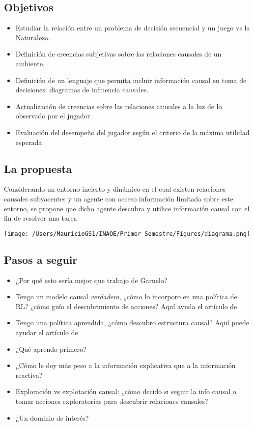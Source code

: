 \documentclass[11pt]{article}
\theoremstyle{plain}
\begin{document}
\subsection{Objetivos}
\begin{itemize}
\item Estudiar la relación entre un problema de decisión secuencial y un juego vs la Naturaleza.
\item Definición de creencias subjetivas sobre las relaciones causales de un ambiente.
\item Definición de un lenguaje que permita incluir información causal en toma de decisiones: diagramas de influencia causales.
\item Actualización de creencias sobre las relaciones causales a la luz de lo observado por el jugador.
\item Evaluación del desempeño del jugador según el criterio de la máxima utilidad esperada
\end{itemize}
\subsection{La propuesta}
Considerando un entorno incierto y dinámico en el cual existen relaciones causales subyacentes y un agente con acceso información limitada sobre este entorno, se propone que dicho agente descubra y utilice información causal con el fin de resolver una tarea
\begin{center}
\texttt{[image: /Users/MauricioGS1/INAOE/Primer\_Semestre/Figures/diagrama.png]}
\end{center}
\subsection{Pasos a seguir}
\begin{itemize}
\item ¿Por qué esto sería mejor que trabajo de Garnelo?
\item Tengo un modelo causal \textit{verdadero}, ¿cómo lo incorporo en una política de RL? ¿cómo guío el descubrimiento de acciones? Aquí ayuda el artículo de \cite{lattimoreNIPS2016}
\item Tengo una política aprendida, ¿cómo descubro estructura causal? Aquí puede ayudar el artículo de \cite{ortega2014generalized}
\item ¿Qué aprendo primero?
\item ¿Cómo le doy más peso a la información explicativa que a la información reactiva?
\item Exploración vs explotación causal: ¿cómo decido si seguir la info causal o tomar acciones exploratorias para descubrir relaciones causales? 
\item ¿Un dominio de interés? 
\end{itemize}
\end{document}
